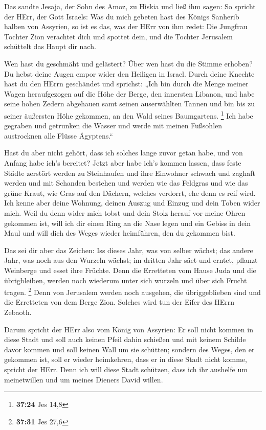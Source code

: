  Das sandte Jesaja, der Sohn des Amoz, zu Hiskia und ließ
ihm sagen: So spricht der HErr, der Gott Israels: Was du mich gebeten
hast des Königs Sanherib halben von Assyrien,  so ist es
das, was der HErr von ihm redet: Die Jungfrau Tochter Zion verachtet
dich und spottet dein, und die Tochter Jerusalem schüttelt das Haupt dir
nach.

 Wen hast du geschmäht und gelästert? Über wen hast du
die Stimme erhoben? Du hebst deine Augen empor wider den Heiligen in
Israel.  Durch deine Knechte hast du den HErrn geschändet
und sprichst: „Ich bin durch die Menge meiner Wagen heraufgezogen auf
die Höhe der Berge, den innersten Libanon, und habe seine hohen Zedern
abgehauen samt seinen auserwählten Tannen und bin bis zu seiner
äußersten Höhe gekommen, an den Wald seines Baumgartens. \footnote{\textbf{37:24}
  Jes 14,8}  Ich habe gegraben und getrunken die Wasser
und werde mit meinen Fußsohlen austrocknen alle Flüsse Ägyptens.``

 Hast du aber nicht gehört, dass ich solches lange zuvor
getan habe, und von Anfang habe ich's bereitet? Jetzt aber habe ich's
kommen lassen, dass feste Städte zerstört werden zu Steinhaufen
 und ihre Einwohner schwach und zaghaft werden und mit
Schanden bestehen und werden wie das Feldgras und wie das grüne Kraut,
wie Gras auf den Dächern, welches verdorrt, ehe denn es reif wird.
 Ich kenne aber deine Wohnung, deinen Auszug und Einzug
und dein Toben wider mich.  Weil du denn wider mich tobst
und dein Stolz herauf vor meine Ohren gekommen ist, will ich dir einen
Ring an die Nase legen und ein Gebiss in dein Maul und will dich des
Weges wieder heimführen, den du gekommen bist.

 Das sei dir aber das Zeichen: Iss dieses Jahr, was von
selber wächst; das andere Jahr, was noch aus den Wurzeln wächst; im
dritten Jahr säet und erntet, pflanzt Weinberge und esset ihre Früchte.
 Denn die Erretteten vom Hause Juda und die übrigbleiben,
werden noch wiederum unter sich wurzeln und über sich Frucht tragen.
\footnote{\textbf{37:31} Jes 27,6}  Denn von Jerusalem
werden noch ausgehen, die übriggeblieben sind und die Erretteten von dem
Berge Zion. Solches wird tun der Eifer des HErrn Zebaoth.

 Darum spricht der HErr also vom König von Assyrien: Er
soll nicht kommen in diese Stadt und soll auch keinen Pfeil dahin
schießen und mit keinem Schilde davor kommen und soll keinen Wall um sie
schütten;  sondern des Weges, den er gekommen ist, soll
er wieder heimkehren, dass er in diese Stadt nicht komme, spricht der
HErr.  Denn ich will diese Stadt schützen, dass ich ihr
aushelfe um meinetwillen und um meines Dieners David willen.

